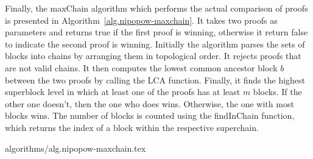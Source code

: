 Finally, the maxChain algorithm which performs the actual comparison of proofs
is presented in Algorithm~\ref{alg.nipopow-maxchain}. It takes two proofs as
parameters and returns true if the first proof is winning, otherwise it return
false to indicate the second proof is winning. Initially the algorithm parses
the sets of blocks into chains by arranging them in topological order. It
rejects proofs that are not valid chains. It then computes the lowest common
ancestor block $b$ between the two proofs by calling the LCA function. Finally,
it finds the highest superblock level in which at least one of the proofs has
at least $m$ blocks. If the other one doesn't, then the one who does wins.
Otherwise, the one with most blocks wins. The number of blocks is counted using
the findInChain function, which returns the index of a block within the
respective superchain.

{algorithms/alg.nipopow-maxchain.tex}
